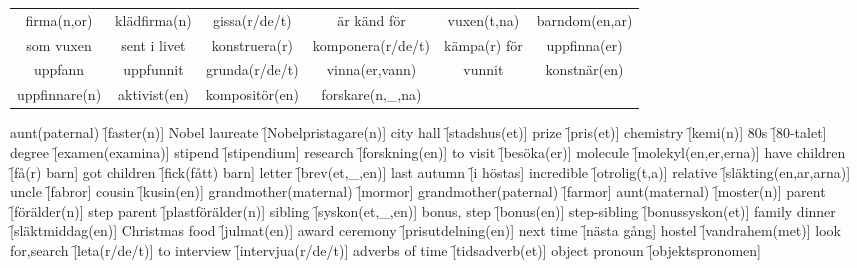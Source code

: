 \begin{center}
\begin{adjustwidth}{-2cm}{}
\begin{tabular}{|c c c c c c|}
            firma(n,or) & klädfirma(n) & gissa(r/de/t) & är känd för & vuxen(t,na) & barndom(en,ar) \\
            som vuxen & sent i livet & konstruera(r) & komponera(r/de/t) & kämpa(r) för & uppfinna(er) \\
            uppfann & uppfunnit & grunda(r/de/t) & vinna(er,vann) & vunnit & konstnär(en) \\
            uppfinnare(n) & aktivist(en) & kompositör(en) & forskare(n,\_,na) &  &  \\
            \hline
        \end{tabular}
    \end{adjustwidth}
\end{center}

\begin{questions}
    \begin{multicols}{2}
        \raggedcolumns
        \question aunt(paternal) \f[faster(n)]
        \question Nobel laureate \f[Nobelpristagare(n)]
        \question city hall \f[stadshus(et)]
        \question prize \f[pris(et)]
        \question chemistry \f[kemi(n)]
        \question 80s \f[80-talet]
        \question degree \f[examen(examina)]
        \question stipend \f[stipendium]
        \question research \f[forskning(en)]
        \question to visit \f[besöka(er)]
        \question molecule \f[molekyl(en,er,erna)]
        \question have children \f[få(r) barn]
        \question got children \f[fick(fått) barn]
        \question letter \f[brev(et,\_,en)]
        \question last autumn \f[i höstas]
        \question incredible \f[otrolig(t,a)]
        \question relative \f[släkting(en,ar,arna)]
        \question uncle \f[fabror]
        \question cousin \f[kusin(en)]
        \question grandmother(maternal) \f[mormor]
        \question grandmother(paternal) \f[farmor]
        \question aunt(maternal) \f[moster(n)]
        \question parent \f[förälder(n)]
        \question step parent \f[plastförälder(n)]
        \question sibling \f[syskon(et,\_,en)]
        \question bonus, step \f[bonus(en)]
        \question step-sibling \f[bonussyskon(et)]
        \question family dinner \f[släktmiddag(en)]
        \question Christmas food \f[julmat(en)]
        \question award ceremony \f[prisutdelning(en)]
        \question next time \f[nästa gång]
        \question hostel \f[vandrahem(met)]
        \question look for,search \f[leta(r/de/t)]
        \question to interview \f[intervjua(r/de/t)]
        \question adverbs of time \f[tidsadverb(et)]
        \question object pronoun \f[objektspronomen]

\end{multicols}
\end{questions}
